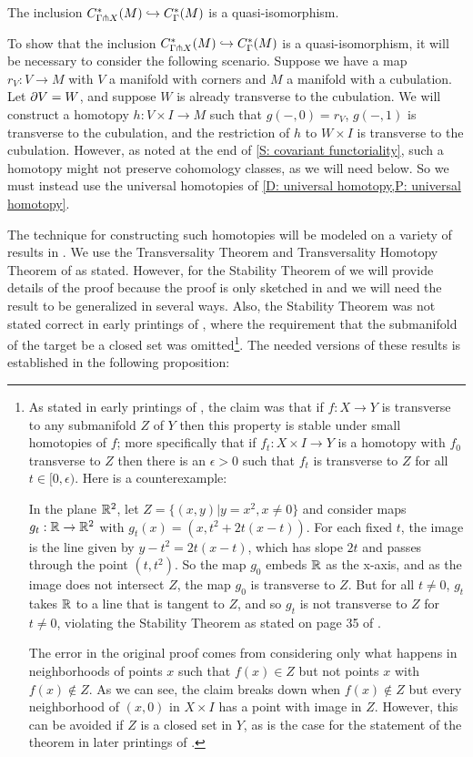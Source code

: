 \begin{theorem}\label{T: transverse complex}
	The inclusion $C^*_{\Gamma \pitchfork X}(M) \hookrightarrow C^*_\Gamma(M)$ is a quasi-isomorphism.
\end{theorem}

To show that the inclusion $C^*_{\Gamma \pitchfork X}(M) \hookrightarrow C^*_\Gamma(M)$ is a quasi-isomorphism, it will be necessary to consider the following scenario.
Suppose we have a map $r_V \colon V \to M$ with $V$ a manifold with corners and $M$ a manifold with a cubulation.
Let $\partial V = W$, and suppose $W$ is already transverse to the cubulation.
We will construct a homotopy $h \colon V \times I \to M$ such that $g(-,0) = r_V$, $g(-,1)$ is transverse to the cubulation, and the restriction of $h$ to $W \times I$ is transverse to the cubulation. However, as noted at the end of \cref{S: covariant functoriality}, such a homotopy might not preserve cohomology classes, as we will need below. So we must instead use the universal homotopies of \cref{D: universal homotopy,P: universal homotopy}.


The technique for constructing such homotopies will be modeled on a variety of results in \cite{GuPo74}.
We use the Transversality Theorem and Transversality Homotopy Theorem of \cite[Section 2.3]{GuPo74} as stated.
However, for the Stability Theorem of \cite[Section 1.6]{GuPo74} we will provide details of the proof because the proof is only sketched in \cite{GuPo74} and we will need the result to be generalized in several ways.
Also, the Stability Theorem was not stated correct in early printings of \cite{GuPo74}, where the requirement that the submanifold of the target be a closed set was omitted\footnote{As stated in early printings of \cite{GuPo74}, the claim was that if $f \colon X \to Y$ is transverse to any submanifold $Z$ of $Y$ then this property is stable under small homotopies of $f$; more specifically that if $f_t:X \times I \to Y$ is a homotopy with $f_0$ transverse to $Z$ then there is an $\epsilon>0$ such that $f_t$ is transverse to $Z$ for all $t\in[0,\epsilon)$.
	Here is a counterexample:

	In the plane $\mathbb{R}^2$, let $Z = \{(x,y)|y = x^2, x\neq 0\}$ and consider maps $g_t: \mathbb{R} \to \mathbb{R}^2$ with
	$g_t(x) = (x,t^2+2t(x-t))$.
	For each fixed $t$, the image is the line given by $y-t^2 = 2t(x-t)$, which has slope $2t$ and passes through the point $(t,t^2)$.
	So the map $g_0$ embeds $\mathbb{R}$ as the x-axis, and as the image does not intersect $Z$, the map $g_0$ is transverse to $Z$.
	But for all $t\neq 0$, $g_t$ takes $\mathbb{R}$ to a line that is tangent to $Z$, and so $g_t$ is not transverse to $Z$ for $t\neq 0$, violating the Stability Theorem as stated on page 35 of \cite{GuPo74}.

	The error in the original proof comes from considering only what happens in neighborhoods of points $x$ such that $f(x) \in Z$ but not points $x$ with $f(x)\notin Z$.
	As we can see, the claim breaks down when $f(x)\notin Z$ but every neighborhood of $(x,0)$ in $X \times I$ has a point with image in $Z$.
	However, this can be avoided if $Z$ is a closed set in $Y$, as is the case for the statement of the theorem in later printings of \cite{GuPo74}.}.
The needed versions of these results is established in the following proposition:

